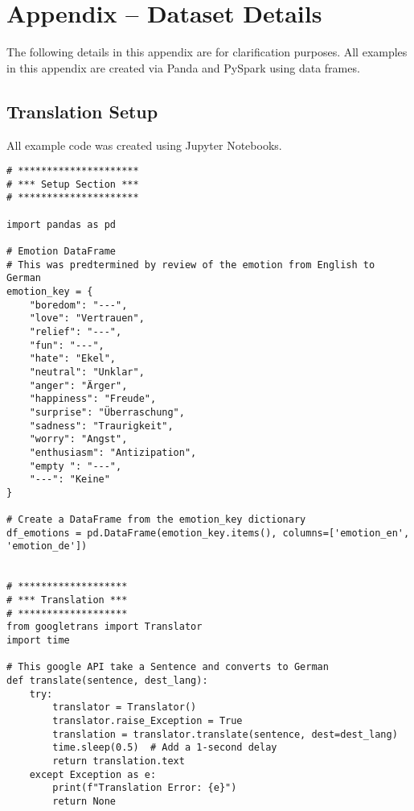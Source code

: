 \section{Appendix -- Dataset Details}
The following details in this appendix are for clarification purposes.
All examples in this appendix are created via Panda and PySpark using data frames.

\subsection{Translation Setup}
All example code was created using Jupyter Notebooks.
\begin{verbatim}
# *********************
# *** Setup Section ***
# *********************

import pandas as pd

# Emotion DataFrame
# This was predtermined by review of the emotion from English to German
emotion_key = {
    "boredom": "---",
    "love": "Vertrauen",
    "relief": "---",
    "fun": "---",
    "hate": "Ekel",
    "neutral": "Unklar",
    "anger": "Ärger",
    "happiness": "Freude",
    "surprise": "Überraschung",
    "sadness": "Traurigkeit",
    "worry": "Angst",
    "enthusiasm": "Antizipation",
    "empty ": "---",
    "---": "Keine"
}

# Create a DataFrame from the emotion_key dictionary
df_emotions = pd.DataFrame(emotion_key.items(), columns=['emotion_en', 'emotion_de'])


# *******************
# *** Translation ***
# *******************
from googletrans import Translator
import time

# This google API take a Sentence and converts to German
def translate(sentence, dest_lang):
    try:
        translator = Translator()
        translator.raise_Exception = True
        translation = translator.translate(sentence, dest=dest_lang)
        time.sleep(0.5)  # Add a 1-second delay
        return translation.text
    except Exception as e:
        print(f"Translation Error: {e}")
        return None
\end{verbatim}
\clearpage


